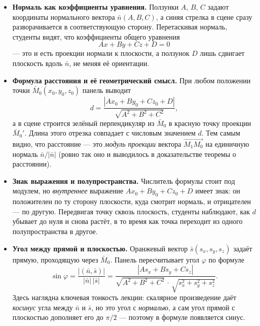 \begin{itemize}
  \item \textbf{Нормаль как коэффициенты уравнения.}
    Ползунки $A$, $B$, $C$ задают координаты нормального вектора
    $\bar{n}(A,B,C)$, а синяя стрелка в сцене сразу разворачивается в
    соответствующую сторону. Перетаскивая нормаль, студенты видят, что
    коэффициенты общего уравнения
    \[
      Ax + By + Cz + D = 0
    \]
    --- это и есть проекции нормали к плоскости, а ползунок $D$ лишь
    сдвигает плоскость вдоль $\bar{n}$, не меняя её ориентации.

  \item \textbf{Формула расстояния и её геометрический смысл.}
    При любом положении точки $\bar{M}_0(x_0,y_0,z_0)$ панель выводит
    \[
      d = \frac{|Ax_0 + By_0 + Cz_0 + D|}{\sqrt{A^2 + B^2 + C^2}},
    \]
    а в сцене строится зелёный перпендикуляр из $\bar{M}_0$ в красную
    точку проекции $\bar{M}_0'$. Длина этого отрезка совпадает с
    числовым значением $d$. Тем самым видно, что расстояние --- это
    \emph{модуль проекции} вектора $\overrightarrow{M_1M_0}$ на
    единичную нормаль $\bar{n}/|\bar{n}|$ (ровно так оно и выводилось в
    доказательстве теоремы о расстоянии).

  \item \textbf{Знак выражения и полупространства.}
    Числитель формулы стоит под модулем, но \emph{внутреннее} выражение
    $Ax_0 + By_0 + Cz_0 + D$ имеет знак: он положителен по ту сторону
    плоскости, куда смотрит нормаль, и отрицателен --- по другую.
    Передвигая точку сквозь плоскость, студенты наблюдают, как $d$
    убывает до нуля и снова растёт, в то время как точка переходит из
    одного полупространства в другое.

  \item \textbf{Угол между прямой и плоскостью.}
    Оранжевый вектор $\bar{s}(s_x,s_y,s_z)$ задаёт прямую, проходящую
    через $\bar{M}_0$. Панель пересчитывает угол $\varphi$ по формуле
    \[
      \sin\varphi
      = \frac{|(\bar{n}, \bar{s})|}{|\bar{n}|\,|\bar{s}|}
      = \frac{|As_x + Bs_y + Cs_z|}
             {\sqrt{A^2+B^2+C^2}\,\cdot\,\sqrt{s_x^2+s_y^2+s_z^2}}.
    \]
    Здесь наглядна ключевая тонкость лекции: скалярное произведение
    даёт \emph{косинус} угла между $\bar{n}$ и $\bar{s}$, но это угол с
    \emph{нормалью}, а сам угол прямой с плоскостью дополняет его до
    $\pi/2$ --- поэтому в формуле появляется синус.
\end{itemize}

